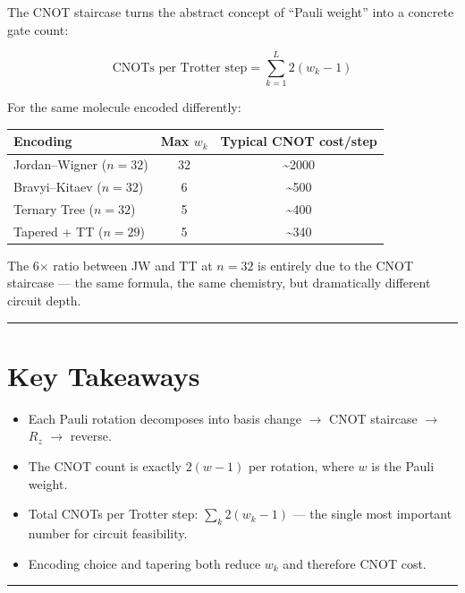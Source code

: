 \documentclass[
  11pt,
  oneside]{book}
\providecommand{\tightlist}{%
  \setlength{\itemsep}{0pt}\setlength{\parskip}{0pt}}
\begin{document}
The CNOT staircase turns the abstract concept of ``Pauli weight'' into a
concrete gate count:

\[\text{CNOTs per Trotter step} = \sum_{k=1}^{L} 2(w_k - 1)\]

For the same molecule encoded differently:

\begin{longtable}[]{@{}lcc@{}}
\toprule\noalign{}
Encoding & Max \(w_k\) & Typical CNOT cost/step \\
\midrule\noalign{}
\endhead
\bottomrule\noalign{}
\endlastfoot
Jordan--Wigner (\(n=32\)) & 32 & \textasciitilde2000 \\
Bravyi--Kitaev (\(n=32\)) & 6 & \textasciitilde500 \\
Ternary Tree (\(n=32\)) & 5 & \textasciitilde400 \\
Tapered + TT (\(n=29\)) & 5 & \textasciitilde340 \\
\end{longtable}

The 6$\times$ ratio between JW and TT at \(n=32\) is entirely due to the CNOT
staircase --- the same formula, the same chemistry, but dramatically
different circuit depth.

\begin{center}\rule{0.5\linewidth}{0.5pt}\end{center}

\section{Key Takeaways}\label{key-takeaways-15}

\begin{itemize}
\tightlist
\item
  Each Pauli rotation decomposes into basis change $\rightarrow$ CNOT staircase $\rightarrow$
  \(R_z\) $\rightarrow$ reverse.
\item
  The CNOT count is exactly \(2(w-1)\) per rotation, where \(w\) is the
  Pauli weight.
\item
  Total CNOTs per Trotter step: \(\sum_k 2(w_k - 1)\) --- the single
  most important number for circuit feasibility.
\item
  Encoding choice and tapering both reduce \(w_k\) and therefore CNOT
  cost.
\end{itemize}

\begin{center}\rule{0.5\linewidth}{0.5pt}\end{center}
\end{document}

